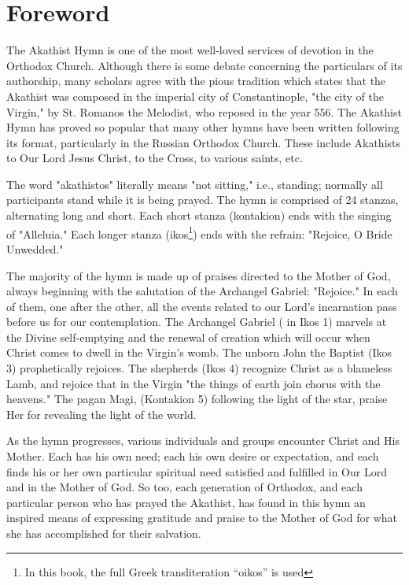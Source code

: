 \begingroup
\let\clearpage\relax
\let\cleardoublepage\relax
\let\cleardoublepage\relax

\chapter*{Foreword}
{\textsc The Akathist Hymn} is one of the most well-loved services of devotion in the Orthodox Church. Although there is some debate concerning the particulars of its authorship, many scholars agree with the pious tradition which states that the Akathist was composed in the imperial city of Constantinople, "the city of the Virgin," by St. Romanos the Melodist, who reposed in the year 556. The Akathist Hymn has proved so popular that many other hymns have been written following its format, particularly in the Russian Orthodox Church. These include Akathists to Our Lord Jesus Christ, to the Cross, to various saints, etc.

The word "akathistos" literally means "not sitting," i.e., standing; normally all participants stand while it is being prayed. The hymn is comprised of 24 stanzas, alternating long and short. Each short stanza (kontakion) ends with the singing of "Alleluia." Each longer stanza (ikos\footnote{In this book, the full Greek transliteration ``oikos'' is used}) ends with the refrain: "Rejoice, O Bride Unwedded."

The majority of the hymn is made up of praises directed to the Mother of God, always beginning with the salutation of the Archangel Gabriel: "Rejoice." In each of them, one after the other, all the events related to our Lord's incarnation pass before us for our contemplation. The Archangel Gabriel ( in Ikos 1) marvels at the Divine self-emptying and the renewal of creation which will occur when Christ comes to dwell in the Virgin's womb. The unborn John the Baptist (Ikos 3) prophetically rejoices. The shepherds (Ikos 4) recognize Christ as a blameless Lamb, and rejoice that in the Virgin "the things of earth join chorus with the heavens." The pagan Magi, (Kontakion 5) following the light of the star, praise Her for revealing the light of the world.

As the hymn progresses, various individuals and groups encounter Christ and His Mother. Each has his own need; each his own desire or expectation, and each finds his or her own particular spiritual need satisfied and fulfilled in Our Lord and in the Mother of God. So too, each generation of Orthodox, and each particular person who has prayed the Akathist, has found in this hymn an inspired means of expressing gratitude and praise to the Mother of God for what she has accomplished for their salvation.

